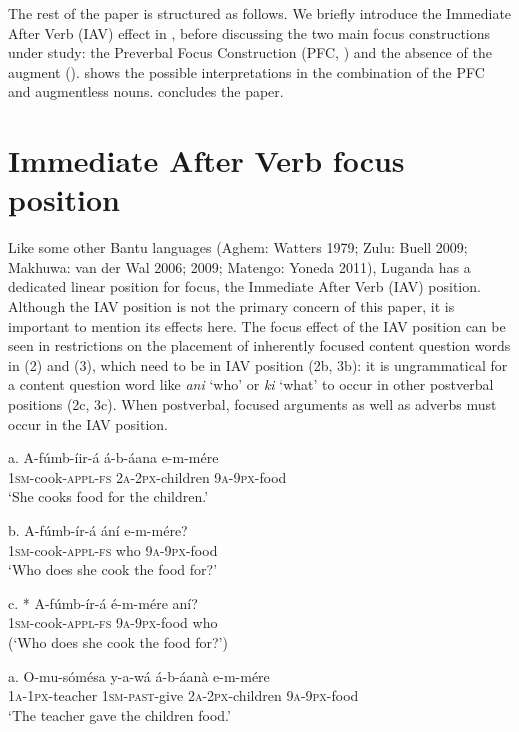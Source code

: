 \documentclass[output=paper]{langsci/langscibook}
\begin{document}
The rest of the paper is structured as follows. We briefly introduce the Immediate After Verb (IAV) effect in , before discussing the two main focus constructions under study: the Preverbal Focus Construction (PFC, ) and the absence of the augment ().  shows the possible interpretations in the combination of the PFC and augmentless nouns.  concludes the paper.

 \section{Immediate After Verb focus position}

Like some other Bantu languages (Aghem: Watters 1979; Zulu: Buell 2009; Makhuwa: van der Wal 2006; 2009; Matengo: Yoneda 2011), Luganda has a dedicated linear position for focus, the Immediate After Verb (IAV) position. Although the IAV position is not the primary concern of this paper, it is important to mention its effects here. The focus effect of the IAV position can be seen in restrictions on the placement of inherently focused content question words in (2) and (3), which need to be in IAV position (2b, 3b): it is ungrammatical for a content question word like \textit{ani} ‘who’ or \textit{ki} ‘what’ to occur in other postverbal positions (2c, 3c). When postverbal, focused arguments as well as adverbs must occur in the IAV position.

\ea
\gll a.  A-fúmb-íir-á    á-b-áana    e-m-mére\\
       \textsc{1sm}-cook-\textsc{appl}-\textsc{fs}  \textsc{2a}-\textsc{2px}-children  \textsc{9a}-\textsc{9px}-food\\
\glt   ‘She cooks food for the children.’
\z

\ea
\gll b.  A-fúmb-ír-á    ání  e-m-mére?\\
       \textsc{1sm}-cook-\textsc{appl}-\textsc{fs}  who  \textsc{9a}-\textsc{9px}-food\\
\glt   ‘Who does she cook the food for?’
\z

\ea
\gll c.  * A-fúmb-ír-á  é-m-mére   aní?\\
       \textsc{1sm}-cook-\textsc{appl}-\textsc{fs}  \textsc{9a-9px}-food  who\\
\glt   (‘Who does she cook the food for?’)
\z

\ea
\gll a.  O-mu-sómésa  y-a-wá     á-b-áanà    e-m-mére\\
       \textsc{1a-1px}-teacher  \textsc{1sm-past}-give  \textsc{2a-2px}-children  \textsc{9a}-\textsc{9px}-food\\
\glt   ‘The teacher gave the children food.’
\z
\end{document}
